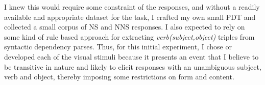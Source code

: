 
%

I knew this would require some constraint of the responses, and without a readily available and appropriate dataset for the task, I crafted my own small PDT and collected a small corpus of NS and NNS responses. I also expected to rely on some kind of rule based approach for extracting \textit{verb(subject,object)} triples from syntactic dependency parses. Thus, for this initial experiment, I chose or developed each of the visual stimuli because
it presents an event that I believe to be transitive in nature and
likely to elicit responses with an unambiguous subject, verb and
object, thereby imposing some restrictions on form and content.

